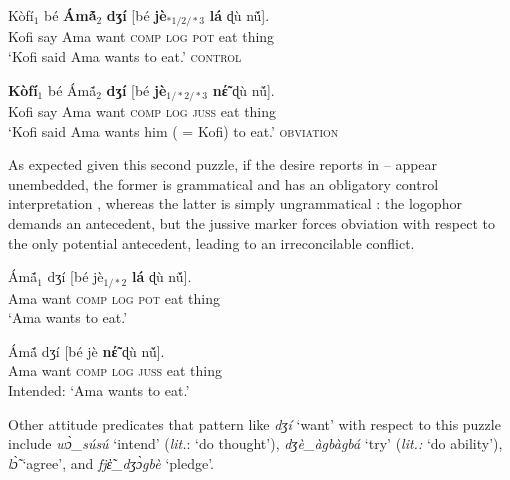 \documentclass[output=paper,modfonts,nonflat]{langsci/langscibook}
\newcommand{\Z}{ʒ}
\newcommand{\D}{ɖ}
\newcommand{\á}{\'{ã}}
\newcommand{\É}{\'{\~{ε}}}
\newcommand{\È}{\`{\~{ε}}}
\newcommand{\í}{\'{\~{i}}}
\newcommand{\ì}{\`{\~{i}}}
\newcommand{\Ó}{\'{\~{ɔ}}}
\newcommand{\Ò}{\`{\~{ɔ}}}
\newcommand{\ú}{\'{ũ}}
\newcommand{\ù}{\`{ũ}}
\begin{document}
\ea
\gll K\`of\'i$_{1}$ b\'e \textbf{\'Am\'{\~a}$_{2}$} \textbf{d{\Z}\'i} [b\'e \textbf{j\`e$_{*1/2/*3}$} \textbf{l\'a} {\D}\`u n\'{\~u}].\\
Kofi say Ama want \textsc{comp} \textsc{log} \textsc{pot} eat thing\\
\glt `Kofi said Ama wants to eat.' \label{ex:grano:wll:13}  \hfill \textsc{control}%
\z

\ea
\gll \textbf{K\`of\'i$_{1}$} b\'e  \'Am\'{\~a}$_{2}$ \textbf{d{\Z}\'i} [b\'e \textbf{j\`e$_{1/*2/*3}$} \textbf{n{\É}} {\D}\`u n\'{\~u}].\\
Kofi say Ama want \textsc{comp} \textsc{log} \textsc{juss} eat thing\\
\glt `Kofi said Ama wants him ( = Kofi) to eat.' \label{ex:grano:wln:14}  \hfill \textsc{obviation}
\z


As expected given this second puzzle, if the desire reports in -- appear unembedded, the former is grammatical and has an obligatory control interpretation , whereas the latter is simply ungrammatical : the logophor demands an antecedent, but the jussive marker forces obviation with respect to the only potential antecedent, leading to an irreconcilable conflict.

\ea
\gll  \'Am\'{\~a}$_{1}$  d{\Z}\'i [b\'e  j\`e$_{1/*2}$ \textbf{l\'a} {\D}\`u n\'{\~u}].\\
Ama want \textsc{comp} \textsc{log} \textsc{pot} eat thing\\
\glt `Ama wants to eat.' \label{ex:grano:wll':15}  %
\z

\ea
\gll *\'Am\'{\~a} d{\Z}\'i [b\'e  j\`e \textbf{n{\É}} {\D}\`u n\'{\~u}].\\
Ama want \textsc{comp} \textsc{log} \textsc{juss} eat thing\\
\glt Intended: `Ama wants to eat.' \label{ex:grano:wln':16}  %
\z

 Other attitude predicates that pattern like \emph{d{\Z}\'i} `want' with respect to this puzzle include \emph{w{\`{ɔ}}\_s\'us\'u} `intend' (\emph{lit.}: `do thought'), \emph{d{\Z}\`e\_\`agb\`agb\'a} `try' (\emph{lit.:} `do ability'), \emph{l{\Ò}} `agree', and \emph{fj{\È}\_d{\Z}{\`{ɔ}}gb\`e} `pledge'. 
\end{document}

